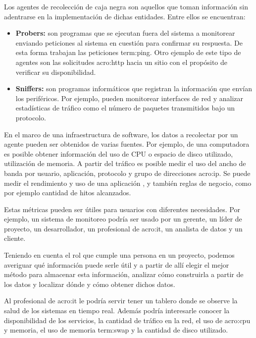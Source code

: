 Los agentes de recolección de caja negra son aquellos que toman información sin
adentrarse en la implementación de dichas entidades. Entre ellos se encuentran:

\begin{itemize}
  \item \textbf{Probers:} son programas que se ejecutan fuera del sistema a
    monitorear enviando peticiones al sistema en cuestión para confirmar su
    respuesta. De esta forma trabajan las peticiones \gls{term:ping}. Otro
    ejemplo de este tipo de agentes son las solicitudes \gls{acro:http} hacia
    un sitio  con el propósito de verificar su disponibilidad.

  \item \textbf{Sniffers:} son programas informáticos que registran la
    información que envían los periféricos. Por ejemplo, pueden monitorear
    interfaces de red y analizar estadísticas de tráfico como el número de
    paquetes transmitidos bajo un protocolo.
    \cite[p.~15-16]{monitoreo:efective_monitoring_and_alerting}
\end{itemize}

En el marco de una infraestructura de software, los datos a recolectar por un
agente pueden ser obtenidos de varias fuentes. Por ejemplo, de una computadora
es posible obtener información del uso de CPU o espacio de disco utilizado,
utilización de memoria. A partir del tráfico  es posible medir el
uso del ancho de banda por usuario, aplicación, protocolo y grupo de
direcciones \gls{acro:ip}. Se puede medir el rendimiento y uso de una
aplicación , y también reglas de negocio, como por ejemplo
cantidad de hitos alcanzados.

Estas métricas pueden ser útiles para usuarios con diferentes necesidades. Por
ejemplo, un sistema de monitoreo podría ser usado por un gerente, un líder de
proyecto, un desarrollador, un profesional de \gls{acro:it}, un analista de
datos y un cliente.

Teniendo en cuenta el rol que cumple una persona en un proyecto, podemos
averiguar qué información puede serle útil y a partir de allí elegir el mejor
método para almacenar esta información, analizar cómo construirla a partir de
los datos y localizar dónde y cómo obtener dichos datos.

Al profesional de \gls{acro:it} le podría servir tener un tablero donde se
observe la salud de los sistemas en tiempo real. Además podría interesarle
conocer la disponibilidad de los servicios, la cantidad de tráfico en la red,
el uso de \gls{acro:cpu} y memoria, el uso de memoria \gls{term:swap} y la
cantidad de disco utilizado.

